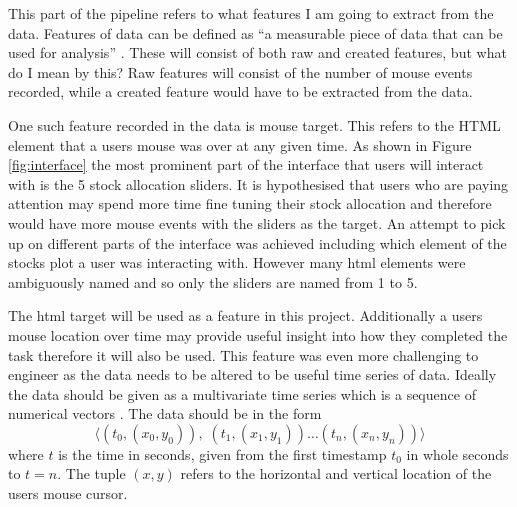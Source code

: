 \documentclass{article}
\begin{document}


This part of the pipeline refers to what features I am going to extract from the data.
Features of data can be defined as ``a measurable piece of data that can be used for analysis'' \cite{DataRobot}.
These will consist of both raw and created features, but what do I mean by this?
Raw features will consist of the number of mouse events recorded, while a created feature would have to be extracted from the data.

One such feature recorded in the data is mouse target.
This refers to the HTML element that a users mouse was over at any given time.
As shown in Figure \ref{fig:interface} the most prominent part of the interface that users will interact with is the 5 stock allocation sliders.
It is hypothesised that users who are paying attention may spend more time fine tuning their stock allocation and therefore would have more mouse events with the sliders as the target.
An attempt to pick up on different parts of the interface was achieved including which element of the stocks plot a user was interacting with.
However many html elements were ambiguously named and so only the sliders are named from 1 to 5.

The html target will be used as a feature in this project.
Additionally a users mouse location over time may provide useful insight into how they completed the task therefore it will also be used.
This feature was even more challenging to engineer as the data needs to be altered to be useful time series of data.
Ideally the data should be given as a multivariate time series which is a sequence of numerical vectors \cite{xing2010brief}.
The data should be in the form
\[    %
    \langle(t_0, (x_0, y_0)),\; (t_1, (x_1, y_1))\hdots (t_n, (x_n, y_n))\rangle 
\]
where $t$ is the time in seconds, given from the first timestamp $t_0$ in whole seconds to $t=n$.
The tuple $(x,y)$ refers to the horizontal and vertical location of the users mouse cursor.
\end{document}
